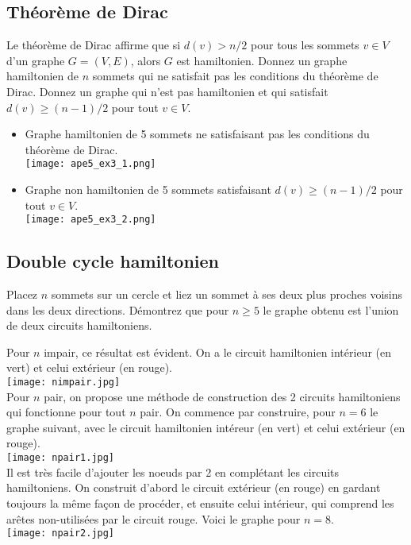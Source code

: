 \subsection{Théorème de Dirac}
Le théorème de Dirac affirme que si $d(v) > n/2$ pour tous les sommets $v \in V$ d'un graphe $G=(V,E)$, alors $G$ est hamiltonien. Donnez un graphe hamiltonien de $n$ sommets qui ne satisfait pas les conditions du théorème de Dirac. Donnez un graphe qui n'est pas hamiltonien et qui satisfait $d(v) \geq (n-1)/2$ pour tout $v \in V$.

\begin{solution}
\begin{itemize}
\item Graphe hamiltonien de 5 sommets ne satisfaisant pas les conditions du théorème de Dirac.\\
\texttt{[image: ape5\_ex3\_1.png]}
\item Graphe non hamiltonien de 5 sommets satisfaisant $d(v) \geq (n-1)/2$ pour tout $v \in V$.\\
\texttt{[image: ape5\_ex3\_2.png]}
\end{itemize}
\end{solution}

\subsection{Double cycle hamiltonien}
Placez $n$ sommets sur un cercle et liez un sommet à ses deux plus proches voisins dans les deux directions. Démontrez que pour $n \geq 5$ le graphe obtenu est l'union de deux circuits hamiltoniens.

\begin{solution}
Pour $n$ impair, ce résultat est évident. On a le circuit hamiltonien intérieur (en vert) et celui extérieur (en rouge).\\
\texttt{[image: nimpair.jpg]}
\\
Pour $n$ pair, on propose une méthode de construction des 2 circuits hamiltoniens qui fonctionne pour tout $n$ pair. On commence par construire, pour $n=6$ le graphe suivant, avec le circuit hamiltonien intéreur (en vert) et celui extérieur (en rouge).
\\
\texttt{[image: npair1.jpg]}
\\
Il est très facile d'ajouter les noeuds par 2 en complétant les circuits hamiltoniens. On construit d'abord le circuit extérieur (en rouge) en gardant toujours la même façon de procéder, et ensuite celui intérieur, qui comprend les arêtes non-utilisées par le circuit rouge. Voici le graphe pour $n=8$.
\\
\texttt{[image: npair2.jpg]}
\\
\end{solution}

